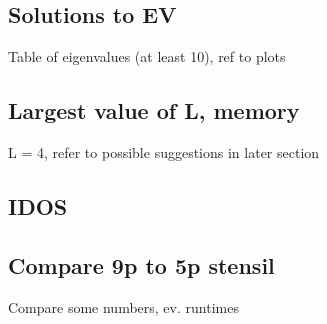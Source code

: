 \documentclass{article}
\begin{document}
\subsection{Solutions to EV}
Table of eigenvalues (at least 10), ref to plots

\subsection{Largest value of L, memory}
L = 4, refer to possible suggestions in later section

\subsection{IDOS}

\subsection{Compare 9p to 5p stensil}
Compare some numbers, ev. runtimes
\end{document}
